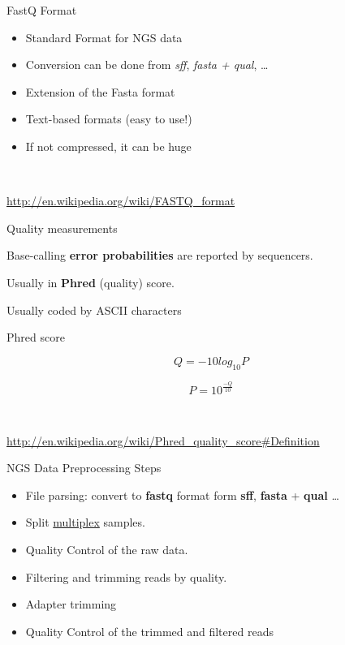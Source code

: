\begin{frame}{FastQ Format}

\begin{itemize}
\itemsep1pt\parskip0pt
\item
  Standard Format for NGS data
\item
  Conversion can be done from \emph{sff}, \emph{fasta + qual}, \ldots{}
\item
  Extension of the Fasta format
\item
  Text-based formats (easy to use!)
\item
  If not compressed, it can be huge
\end{itemize}

~

\url{http://en.wikipedia.org/wiki/FASTQ_format}

\end{frame}

\begin{frame}{Quality measurements}

Base-calling \textbf{error probabilities} are reported by sequencers.

Usually in \textbf{Phred} (quality) score.

Usually coded by ASCII characters

\begin{block}{Phred score}

\[Q = -10 log_{10} P\]

\[P = 10^{\frac{-Q}{10}}\]

~

\url{http://en.wikipedia.org/wiki/Phred_quality_score\#Definition}

\end{block}

\end{frame}

\begin{frame}{NGS Data Preprocessing Steps}

\begin{itemize}
\item
  File parsing: convert to \textbf{fastq} format form \textbf{sff},
  \textbf{fasta} + \textbf{qual} \ldots{}
\item
  Split
  \href{http://www.illumina.com/technology/multiplexing_sequencing_assay.ilmn}{multiplex}
  samples.
\item
  Quality Control of the raw data.
\item
  Filtering and trimming reads by quality.
\item
  Adapter trimming
\item
  Quality Control of the trimmed and filtered reads
\end{itemize}

\end{frame}

